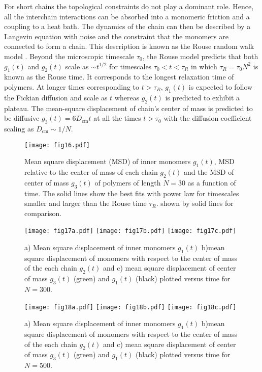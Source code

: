 \documentclass[pre,showpacs,notitlepage,twocolumn]{revtex4-1}
\begin{document}
 For short chains the topological constraints do not play a dominant
role. Hence,  all the interchain interactions can be absorbed into a monomeric friction and a coupling to a heat
bath. The dynamics of the chain can then be described by a Langevin
equation with noise and the constraint that the monomers
are connected to form a chain. This description is known as the Rouse random walk model \cite{polymerDoi,Rubinstein}.
Beyond the microscopic timescale $\tau_0$, the Rouse model predicts that both  $ g_1(t)$ and $g_2(t)$  scale as $\sim t^{1/2}$ for timescales $ \tau_0< t < \tau_R $
in which  $\tau_R = \tau_0 N^2$ is known as  the Rouse time. It corresponds to the longest relaxation time of  polymers.  At longer times corresponding to
$t >\tau_R $, $ g_1(t)$ is expected to follow the Fickian diffusion and scale as $t$ whereas $g_2(t)$ is predicted to exhibit a plateau.
  The mean-square displacement of chain's center of mass is predicted to be diffusive $ g_3(t)=6 D_{\text{cm}} t$ at all  the times $t > \tau_0 $ 
  with the diffusion coefficient scaling as $D_{\text{cm}} \sim  1/ N$. 
 
 
 

\begin{figure}[t]
\texttt{[image: fig16.pdf]}
\caption{Mean square displacement (MSD) of inner monomers $g_1(t)$, MSD relative to the center of mass of
  each chain  $g_2(t)$ and the MSD of center of  mass $g_3(t)$ of polymers of length  $N = 30$ as a function of time. The solid lines show the best fits with power law for timescales smaller and larger than the Rouse time $\tau_R$.  
shown by solid lines for comparison. }
\label{fig16} 
\end{figure}

\begin{figure*}[t]
\texttt{[image: fig17a.pdf]}
\texttt{[image: fig17b.pdf]}
\texttt{[image: fig17c.pdf]}
\caption{ a) Mean square displacement of inner monomers $g_1(t)$ b)mean square displacement of  monomers with respect to the center of mass of
the each chain  $g_2(t)$ and c) mean square displacement of center of mass $g_3(t)$ (green) and $g_1(t)$ (black) plotted versus time  for $N = 300$. }
\label{fig17} 
\end{figure*}
%
\begin{figure*}[t]
\texttt{[image: fig18a.pdf]}
\texttt{[image: fig18b.pdf]}
\texttt{[image: fig18c.pdf]}
\caption{ a) Mean square displacement of inner monomers $g_1(t)$ b)mean square displacement of  monomers with respect to the center of mass of
the each chain  $g_2(t)$ and c) mean square displacement of center of mass $g_3(t)$ (green) and $g_1(t)$ (black) plotted versus time  for $N = 500$. }
\label{fig18} 
\end{figure*}
%
  
\end{document}
